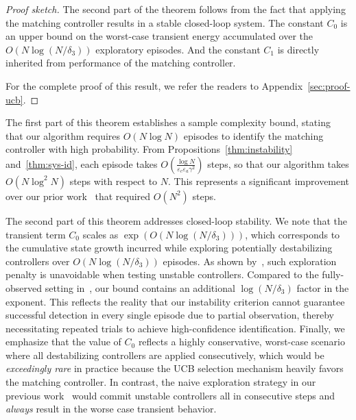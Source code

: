 \documentclass[11pt, twoside]{article}
\theoremstyle{definition}
\begin{document}
\begin{proof}[Proof sketch]
The second part of the theorem follows from the fact that applying the matching controller results in a stable closed-loop system.
The constant $C_0$ is an upper bound on the worst-case transient energy accumulated over the $O(N \log (N/\delta_3))$ exploratory episodes.
And the constant $C_1$ is directly inherited from performance of the matching controller.

For the complete proof of this result, we refer the readers to Appendix~\ref{sec:proof-ucb}.
\end{proof}

The first part of this theorem establishes a sample complexity bound, stating that our algorithm requires $O(N \log N)$ episodes to identify the matching controller with high probability.
From Propositions~\ref{thm:instability} and~\ref{thm:sys-id}, each episode takes $O(\frac{\log N}{\varepsilon_c\varepsilon_a \gamma^2})$ steps, so that our algorithm takes $O(N \log^2 N)$ steps with respect to $N$.
This represents a significant improvement over our prior work~\citep{sun2024least} that required $O(N^2)$ steps.

The second part of this theorem addresses closed-loop stability.
We note that the transient term $C_0$ scales as $\exp(O(N \log(N/\delta_3)))$, which corresponds to the cumulative state growth incurred while exploring potentially destabilizing controllers over $O(N \log (N/\delta_3))$ episodes.
As shown by~\citet{chen2021black}, such exploration penalty is unavoidable when testing unstable controllers.
Compared to the fully-observed setting in~\citet{li2023online}, our bound contains an additional $\log(N/\delta_3)$ factor in the exponent.
This reflects the reality that our instability criterion cannot guarantee successful detection in every single episode due to partial observation, thereby necessitating repeated trials to achieve high-confidence identification.
Finally, we emphasize that the value of $C_0$ reflects a highly conservative, worst-case scenario where all destabilizing controllers are applied consecutively, which would be \textit{exceedingly rare} in practice because the UCB selection mechanism heavily favors the matching controller.
In contrast, the naive exploration strategy in our previous work~\cite{sun2024least} would commit unstable controllers all in consecutive steps and \textit{always} result in the worse case transient behavior.
\end{document}
